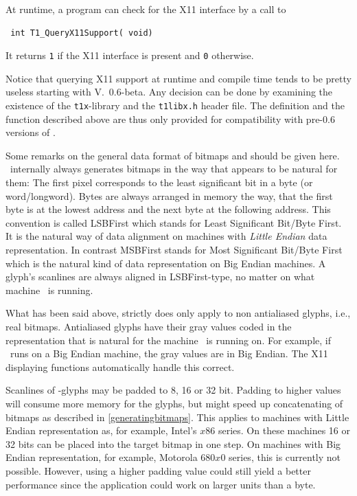 At runtime, a program can check for the X11 interface by a call to 
\precorr
\begin{verbatim}
 int T1_QueryX11Support( void)
\end{verbatim}\postcorr
It returns \verb+1+ if the X11 interface is present and \verb+0+ otherwise.

Notice that querying X11 support at runtime and compile time tends to
be pretty useless starting with V.~0.6-beta. Any decision can be done
by examining the existence of the \verb+t1x+-library and the
\verb+t1libx.h+ header file. The definition and the function described
above are thus only provided for compatibility with pre-0.6 versions
of \tonelib. 

Some remarks on the general data format of bitmaps and should be given
here. \tonelib\ internally always generates bitmaps in the way that appears to
be natural for them: The first pixel corresponds to the least significant bit
in a byte (or word/longword). Bytes are always arranged in memory the way,
that the first byte is at the lowest address and the next byte at the
following address. This convention is called LSBFirst which stands for Least
Significant Bit/Byte First. It is the natural way of data alignment on
machines with {\em Little Endian} data representation. In contrast MSBFirst
stands for Most Significant Bit/Byte First which is the natural kind of data
representation on Big Endian machines. 
A glyph's scanlines are always aligned in LSBFirst-type, no matter on what
machine \tonelib\ is running.  

What has been said above, strictly does only apply to non antialiased glyphs,
i.e., real bitmaps. Antialiased glyphs have their gray values coded in the
representation that is natural for the machine \tonelib\ is running on. For
example, if \tonelib\ runs on a Big Endian machine, the gray values are in Big
Endian. The X11 displaying functions automatically handle this correct.

Scanlines of \tonelib-glyphs may be padded to 8, 16 or 32 bit. Padding to
higher values will consume more memory for the glyphs, but might speed up
concatenating of bitmaps as described in \ref{generatingbitmaps}. This applies
to machines with Little Endian representation as, for example, Intel's 
$x$86 series. On these machines 16 or 32 bits can be placed into the
target bitmap in one step. On machines with Big Endian representation, for
example, Motorola 680$x$0 series, this is currently not possible. However,
using a higher padding value could still yield a better performance since the
application could work on larger units than a byte.


